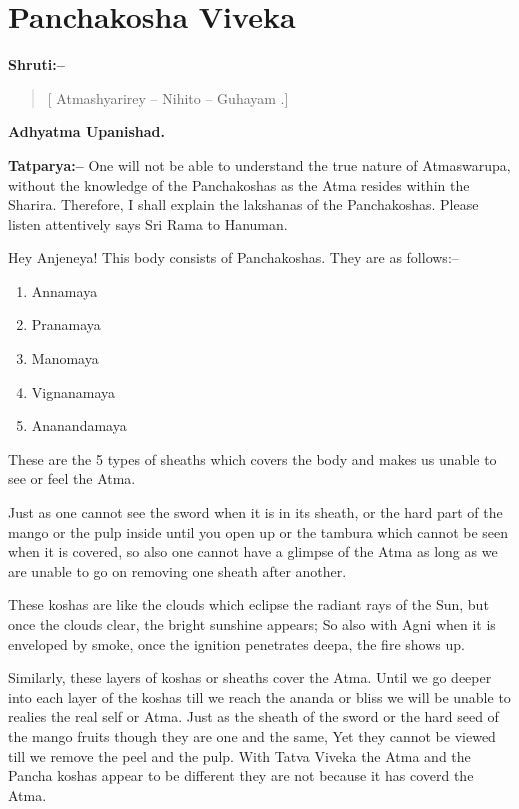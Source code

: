 \chapter{Panchakosha Viveka}

\textbf{Shruti:–}

\begin{verse}
[ Atmashyarirey – Nihito – Guhayam .]
\end{verse}

\begin{flushright}
\textbf{Adhyatma Upanishad.}
\end{flushright}

\textbf{Tatparya:–} One will not be able to understand the true nature of Atmaswarupa, without the knowledge of the Panchakoshas as the Atma resides within the Sharira. Therefore, I shall explain the lakshanas of the Panchakoshas. Please listen attentively says Sri Rama to Hanuman.

Hey Anjeneya! This body consists of Panchakoshas. They are as follows:–

\begin{enumerate}
\item Annamaya

 \item Pranamaya

 \item Manomaya

 \item Vignanamaya

 \item Ananandamaya

\end{enumerate}

These are the 5 types of sheaths which covers the body and makes us unable to see or feel the Atma.

Just as one cannot see the sword when it is in its sheath, or the hard part of the mango or the pulp inside until you open up or the tambura which cannot be seen when it is covered, so also one cannot have a glimpse of the Atma as long as we are unable to go on removing one sheath after another.

These koshas are like the clouds which eclipse the radiant rays of the Sun, but once the clouds clear, the bright sunshine appears; So also with Agni when it is enveloped by smoke, once the ignition penetrates deepa, the fire shows up.

Similarly, these layers of koshas or sheaths cover the Atma. Until we go deeper into each layer of the koshas till we reach the ananda or bliss we will be unable to realies the real self or Atma. Just as the sheath of the sword or the hard seed of the mango fruits though they are one and the same, Yet they cannot be viewed till we remove the peel and the pulp. With Tatva Viveka the Atma and the Pancha koshas appear to be different they are not because it has coverd the Atma.

